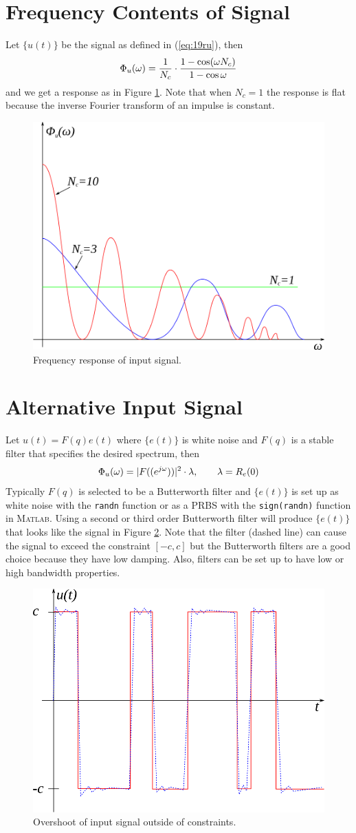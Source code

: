 \section{Frequency Contents of Signal}
Let $\{u(t)\}$ be the signal as defined in (\ref{eq:19ru}), then
$$\Phi_u(\omega) = \frac{1}{N_c}\cdot\frac{1-\cos(\omega N_c)}{1-\cos\omega}$$
and we get a response as in Figure \ref{fig:19fr}. Note that when $N_c=1$ the response is flat because the inverse Fourier transform of an impulse is constant.

\begin{figure}[ht!]
	\centering
	\includegraphics[width=.4\textwidth]{images/19fr}
	\caption{Frequency response of input signal.}
	\label{fig:19fr}
\end{figure}

\section{Alternative Input Signal}
Let $u(t)=F(q)e(t)$ where $\{e(t)\}$ is white noise and $F(q)$ is a stable filter that specifies the desired spectrum, then
$$\Phi_u(\omega) = |F((e^{j\omega}))|^2\cdot\lambda, \qquad \lambda = R_e(0)$$
Typically $F(q)$ is selected to be a Butterworth filter and $\{e(t)\}$ is set up as white noise with the \texttt{randn} function or as a PRBS with the \texttt{sign(randn)} function in \textsc{Matlab}. Using a second or third order Butterworth filter will produce $\{e(t)\}$ that looks like the signal in Figure \ref{fig:19ripple}. Note that the filter (dashed line) can cause the signal to exceed the constraint $[-c,c]$ but the Butterworth filters are a good choice because they have low damping. Also, filters can be set up to have low or high bandwidth properties.

\begin{figure}[ht!]
	\centering
	\includegraphics[width=.4\textwidth]{images/19ripple}
	\caption{Overshoot of input signal outside of constraints.}
	\label{fig:19ripple}
\end{figure}

